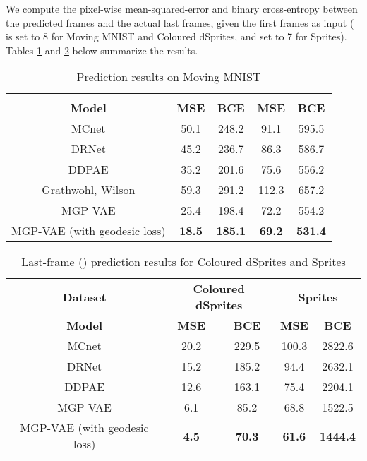 \documentclass[runningheads]{llncs}
\begin{document}
   We compute the pixel-wise mean-squared-error and binary cross-entropy between the predicted  frames and the actual last  frames, given the first  frames as input ( is set to 8 for Moving MNIST and Coloured dSprites, and set to 7 for Sprites). Tables \ref{mse_bce_mnist} and \ref{mse_bce_dsprites} below summarize the results. \par
   


   \begin{table}[H]
      \centering
      \caption{Prediction results on Moving MNIST}        
		\begin{tabular}{ccccc} \hline 
		    \label{mse_bce_mnist}
			& \multicolumn{2}{c}{} 
			& \multicolumn{2}{c}{}  \\ \cmidrule(lr){2-3} \cmidrule(lr){4-5}				
			\textbf{Model} & \textbf{MSE} & \textbf{BCE} & \textbf{MSE} & \textbf{BCE} \\ \hline					
			MCnet \cite{Villegas2017DecomposingMA} & 50.1 & 248.2 & 91.1 & 595.5 \\		
			DRNet \cite{Denton2017UnsupervisedLO} & 45.2 & 236.7 & 86.3 & 586.7 \\		
			DDPAE \cite{Hsieh2018LearningTD} & 35.2 & 201.6 & 75.6 & 556.2 \\		
			Grathwohl, Wilson \cite{Grathwohl2016DisentanglingSA} & 59.3 & 291.2 & 112.3 & 657.2 \\		
			MGP-VAE & 25.4 & 198.4 & 72.2 & 554.2 \\		
			MGP-VAE (with geodesic loss) & \textbf{18.5} & \textbf{185.1} & \textbf{69.2} & \textbf{531.4} \\ \hline
      \end{tabular}
	\end{table}

  \begin{table}[!htb]
      \centering
        \caption{Last-frame () prediction results for Coloured dSprites and Sprites}        
        \begin{tabular}{ccccc} \hline       
          \label{mse_bce_dsprites}
          \textbf{Dataset} & \multicolumn{2}{c}{\textbf{Coloured dSprites}} 
          & \multicolumn{2}{c}{\textbf{Sprites}}  \\ \cmidrule(lr){2-3} \cmidrule(lr){4-5}          
          \textbf{Model} & \textbf{MSE} & \textbf{BCE} & \textbf{MSE} & \textbf{BCE} \\ \hline               
          MCnet \cite{Villegas2017DecomposingMA} & 20.2 & 229.5  & 100.3 & 2822.6 \\          
          DRNet \cite{Denton2017UnsupervisedLO} & 15.2 & 185.2 & 94.4 & 2632.1 \\       
          DDPAE \cite{Hsieh2018LearningTD} & 12.6 & 163.1 & 75.4 & 2204.1 \\      
          MGP-VAE & 6.1 & 85.2 & 68.8 & 1522.5 \\      
          MGP-VAE (with geodesic loss) & \textbf{4.5} & \textbf{70.3} & \textbf{61.6} & \textbf{1444.4} \\ \hline 
          \end{tabular}
\end{table}
   
\end{document}
